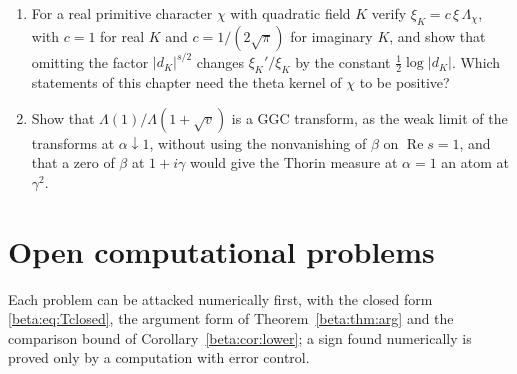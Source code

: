 \begin{enumerate}
\item For a real primitive character $\chi$ with quadratic field $K$ verify $\xi_K=c\,\xi\,\Lambda_\chi$, with $c=1$ for real $K$ and $c=1/(2\sqrt\pi)$ for imaginary $K$, and show that omitting the factor $|d_K|^{s/2}$ changes $\xi_K'/\xi_K$ by the constant $\tfrac12\log|d_K|$. Which statements of this chapter need the theta kernel of $\chi$ to be positive?
\item Show that $\Lambda(1)/\Lambda(1+\sqrt v)$ is a GGC transform, as the weak limit of the transforms at $\alpha\downarrow1$, without using the nonvanishing of $\beta$ on $\operatorname{Re}s=1$, and that a zero of $\beta$ at $1+i\gamma$ would give the Thorin measure at $\alpha=1$ an atom at $\gamma^2$.
\end{enumerate}


\section{Open computational problems}

Each problem can be attacked numerically first, with the closed form \eqref{beta:eq:Tclosed}, the argument form of Theorem~\ref{beta:thm:arg} and the comparison bound of Corollary~\ref{beta:cor:lower}; a sign found numerically is proved only by a computation with error control.

